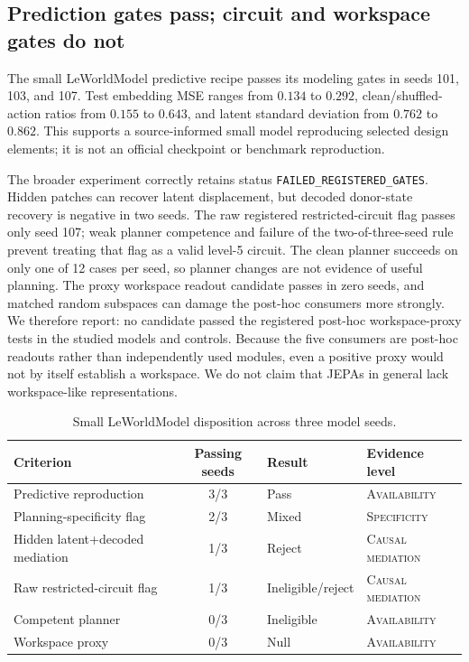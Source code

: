 \documentclass[10pt]{article}
\newcommand{\code}[1]{\texttt{#1}}
\newcommand{\level}[1]{{\scriptsize\textsc{#1}}}
\begin{document}
\subsection{Prediction gates pass; circuit and workspace gates do not}

The small LeWorldModel predictive recipe passes its modeling gates in seeds
101, 103, and 107.  Test embedding MSE ranges from $0.134$ to $0.292$,
clean/shuffled-action ratios from $0.155$ to $0.643$, and latent standard
deviation from $0.762$ to $0.862$.  This supports a source-informed small model
reproducing selected design elements; it is not an official checkpoint or
benchmark reproduction.

The broader experiment correctly retains status
\code{FAILED\_REGISTERED\_GATES}.  Hidden patches can recover latent
displacement, but decoded donor-state recovery is negative in two seeds.  The
raw registered restricted-circuit flag passes only seed 107; weak planner
competence and failure of the two-of-three-seed rule prevent treating that flag as a valid
level-5 circuit.  The clean planner succeeds on only one of 12 cases per seed,
so planner changes are not evidence of useful planning.  The proxy workspace
readout candidate passes in zero seeds, and matched random subspaces can damage
the post-hoc consumers more strongly.  We therefore report: no
candidate passed the registered post-hoc workspace-proxy tests in the studied
models and controls.  Because the five consumers are post-hoc readouts rather
than independently used modules, even a positive proxy would not by itself
establish a workspace.  We do not claim that JEPAs in general lack
workspace-like representations.

\begin{table}[t]
\centering
\small
\caption{Small LeWorldModel disposition across three model seeds.}
\label{tab:world}
\begin{tabular}{@{}lcll@{}}
\toprule
Criterion & Passing seeds & Result & Evidence level \\
\midrule
Predictive reproduction & 3/3 & Pass & \level{Availability} \\
Planning-specificity flag & 2/3 & Mixed & \level{Specificity} \\
Hidden latent+decoded mediation & 1/3 & Reject & \level{Causal mediation} \\
Raw restricted-circuit flag & 1/3 & Ineligible/reject & \level{Causal mediation} \\
Competent planner & 0/3 & Ineligible & \level{Availability} \\
Workspace proxy & 0/3 & Null & \level{Availability} \\
\bottomrule
\end{tabular}
\end{table}
\end{document}
